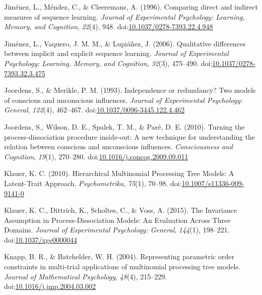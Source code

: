 \documentclass[jou]{apa6}
\theoremstyle{definition}
\theoremstyle{definition}
\theoremstyle{definition}
\theoremstyle{remark}
\begin{document}
\hypertarget{ref-jimenez_comparing_1996}{}
Jiménez, L., Méndez, C., \& Cleeremans, A. (1996). Comparing direct and
indirect measures of sequence learning. \emph{Journal of Experimental
Psychology: Learning, Memory, and Cognition}, \emph{22}(4), 948.
doi:\href{https://doi.org/10.1037/0278-7393.22.4.948}{10.1037/0278-7393.22.4.948}

\hypertarget{ref-jimenez_qualitative_2006}{}
Jiménez, L., Vaquero, J. M. M., \& Lupiáñez, J. (2006). Qualitative
differences between implicit and explicit sequence learning.
\emph{Journal of Experimental Psychology: Learning, Memory, and
Cognition}, \emph{32}(3), 475--490.
doi:\href{https://doi.org/10.1037/0278-7393.32.3.475}{10.1037/0278-7393.32.3.475}

\hypertarget{ref-joordens_independence_1993}{}
Joordens, S., \& Merikle, P. M. (1993). Independence or redundancy? Two
models of conscious and unconscious influences. \emph{Journal of
Experimental Psychology: General}, \emph{122}(4), 462--467.
doi:\href{https://doi.org/10.1037/0096-3445.122.4.462}{10.1037/0096-3445.122.4.462}

\hypertarget{ref-joordens_turning_2010}{}
Joordens, S., Wilson, D. E., Spalek, T. M., \& Paré, D. E. (2010).
Turning the process-dissociation procedure inside-out: A new technique
for understanding the relation between conscious and unconscious
influences. \emph{Consciousness and Cognition}, \emph{19}(1), 270--280.
doi:\href{https://doi.org/10.1016/j.concog.2009.09.011}{10.1016/j.concog.2009.09.011}

\hypertarget{ref-klauer_hierarchical_2010}{}
Klauer, K. C. (2010). Hierarchical Multinomial Processing Tree Models: A
Latent-Trait Approach. \emph{Psychometrika}, \emph{75}(1), 70--98.
doi:\href{https://doi.org/10.1007/s11336-009-9141-0}{10.1007/s11336-009-9141-0}

\hypertarget{ref-klauer_invariance_2015}{}
Klauer, K. C., Dittrich, K., Scholtes, C., \& Voss, A. (2015). The
Invariance Assumption in Process-Dissociation Models: An Evaluation
Across Three Domains. \emph{Journal of Experimental Psychology:
General}, \emph{144}(1), 198--221.
doi:\href{https://doi.org/10.1037/xge0000044}{10.1037/xge0000044}

\hypertarget{ref-knapp_representing_2004}{}
Knapp, B. R., \& Batchelder, W. H. (2004). Representing parametric order
constraints in multi-trial applications of multinomial processing tree
models. \emph{Journal of Mathematical Psychology}, \emph{48}(4),
215--229.
doi:\href{https://doi.org/10.1016/j.jmp.2004.03.002}{10.1016/j.jmp.2004.03.002}
\end{document}
